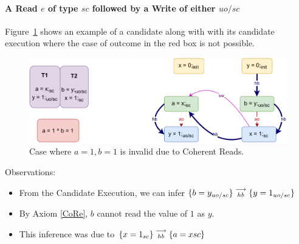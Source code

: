         
    
    \paragraph{A Read $e$ of type $sc$ followed by a Write of either $uo/sc$}
        
        Figure~\ref{reord_counter:example2(a)} shows an example of a candidate along with with its candidate execution where the case of outcome in the red box is not possible. 
        \begin{figure}[H]
            \centering
            \includegraphics[scale=0.7]{5.InstructionReordering/4.ValidReorderingCandidate/Example3(Rsc-Wuo,sc).pdf}
            \caption{Case where $a = 1, b = 1$ is invalid due to Coherent Reads.}
            \label{reord_counter:example2(a)}
        \end{figure}

        Observations:
        \begin{itemize}
            \item From the Candidate Execution, we can infer $\{b=y_{uo/sc}\}\stackrel{\longrightarrow}{_{hb}}\{y=1_{uo/sc}\}$
            \item By Axiom \ref{CoRe}, $b$ cannot read the value of $1$ as $y$. 
            \item This inference was due to $\{x=1_{sc}\}\stackrel{\longrightarrow}{_{hb}}\{a=x{sc}\}$
        \end{itemize}

